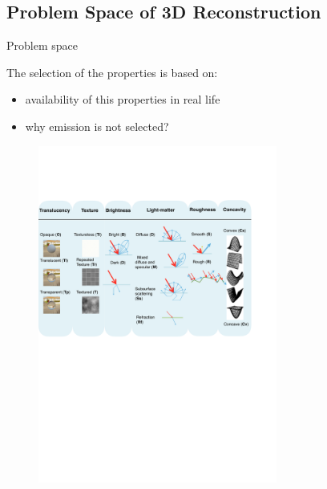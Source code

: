 \documentclass[10pt]{beamer}
\begin{document}
\subsection{Problem Space of 3D Reconstruction}
\begin{frame}{Problem space}

The selection of the properties is based on:
\begin{itemize}
\item availability of this properties in real life
\item why emission is not selected?
\end{itemize}

\begin{figure}
\includegraphics[width=0.7\textwidth]{prob_space/obj_class}
\end{figure}

\end{frame}
\end{document}
